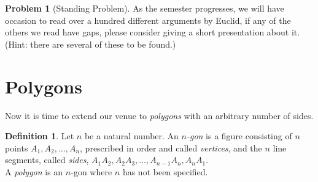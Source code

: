 \documentclass{tufte-handout}
\theoremstyle{definition}
\newtheorem{problem}{Problem}[section]
\newtheorem*{definition}{Definition}
\begin{document}
\begin{problem}[Standing Problem]
As the semester progresses, we will have occasion to read over a hundred different arguments by Euclid, if any of the others we read have gaps, please consider giving a short presentation about it.
(Hint: there are several of these to be found.)
\end{problem}


\clearpage
\setcounter{section}{5}
\setcounter{problem}{0}
\section{Polygons}
Now it is time to extend our venue to \emph{polygons} with an arbitrary number of sides.

\begin{definition}\label{defn:n-gon}
Let $n$ be a natural number. An \emph{$n$-gon} is a figure consisting of $n$ points $A_1, A_2, \ldots, A_n$, prescribed in order and called \emph{vertices}, and the $n$ line segments, called \emph{sides}, $A_1A_2, A_2A_3, \ldots, A_{n-1}A_n, A_nA_1$.\\
A \emph{polygon} is an $n$-gon where $n$ has not been specified.
\end{definition}
\end{document}
